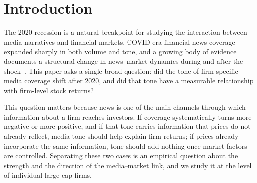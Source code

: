\documentclass[conference]{IEEEtran}
\begin{document}
\begin{abstract}
This paper studies how media reporting about large-cap firms changed around the
2020 recession and how firm-level media stance and stock returns relate to one
another. We do not assume the influence runs in a single direction: we test both
whether stance moves subsequent returns and whether returns move subsequent
coverage. We compute daily target-dependent stance with a NewsMTSC pipeline from
$690{,}586$ scored news headlines (2015--2025) across 26 S\&P~500 firms, keep the
$90{,}579$ that report a material firm event, and align this stance with firm-day
returns and market controls. We ask
whether firm-level media stance shifted after January 2020 (RQ1), whether
firm-specific returns shifted (RQ2), and whether past stance and past
returns help predict each other (RQ3). RQ1 and RQ2 use two-way fixed-effects
pre/post panel regressions; RQ3 uses a weekly vector autoregression with
Granger-causality tests. We find no significant aggregate shift in either stance
or returns once common daily and monthly shocks are absorbed, and we find that
the stance--return link is firm-specific rather than a market-wide regularity.
\end{abstract}

\section{Introduction}
The 2020 recession is a natural breakpoint for studying the interaction between media narratives and financial markets. COVID-era financial news coverage expanded sharply in both volume and tone, and a growing body of evidence documents a structural change in news--market dynamics during and after the shock~\cite{costola2023, news2024}. This paper asks a single broad question: did the tone of firm-specific media coverage shift after 2020, and did that tone have a measurable relationship with firm-level stock returns?

This question matters because news is one of the main channels through which information about a firm reaches investors. If coverage systematically turns more negative or more positive, and if that tone carries information that prices do not already reflect, media tone should help explain firm returns; if prices already incorporate the same information, tone should add nothing once market factors are controlled. Separating these two cases is an empirical question about the strength and the direction of the media--market link, and we study it at the level of individual large-cap firms.
\end{document}
